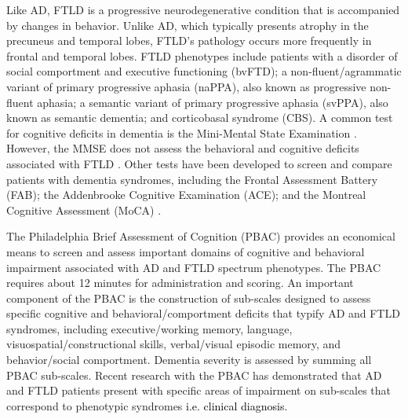 \documentclass[preprint,authoryear,12pt]{elsarticle}
\begin{document}
Like AD, FTLD is a progressive neurodegenerative condition that is accompanied by changes in behavior.  Unlike AD, which typically presents atrophy in the precuneus and temporal lobes, FTLD's pathology occurs more frequently in frontal and temporal lobes\citet{Rabinovici2007,Whitwell2007d}.  FTLD phenotypes include patients with a disorder of social comportment and executive functioning (bvFTD); a non-fluent/agrammatic variant of primary progressive aphasia (naPPA), also known as progressive non-fluent aphasia; a semantic variant of primary progressive aphasia (svPPA), also known as semantic dementia; and corticobasal syndrome (CBS).  A common test for cognitive deficits in dementia is the Mini-Mental State Examination \citet{Hill1995}. However, the MMSE does not assess the behavioral and cognitive deficits associated with FTLD \citet{Hutchinson2007}.  Other tests have been developed to screen and compare patients with dementia syndromes, including the Frontal Assessment Battery \citet{Dubois2000} (FAB); the Addenbrooke Cognitive Examination \citet{Galton2005} (ACE); and the Montreal Cognitive Assessment (MoCA) \citet{Nasreddine2005}.

The Philadelphia Brief Assessment of Cognition \citet{Libon2007,libon_philadelphia_2011} (PBAC) provides an economical means to screen and assess important domains of cognitive and behavioral impairment associated with AD and FTLD spectrum phenotypes.  The PBAC requires about 12 minutes for administration and scoring.  An important component of the PBAC is the construction of sub-scales designed to assess specific cognitive and behavioral/comportment deficits that typify AD and FTLD syndromes, including executive/working memory, language, visuospatial/constructional skills, verbal/visual episodic memory, and behavior/social comportment.  Dementia severity is assessed by summing all PBAC sub-scales.  Recent research with the PBAC has demonstrated that AD and FTLD patients present with specific areas of impairment on sub-scales that correspond to phenotypic syndromes \citet{libon_philadelphia_2011} \textcolor{black}{i.e. clinical diagnosis.}
\end{document}
